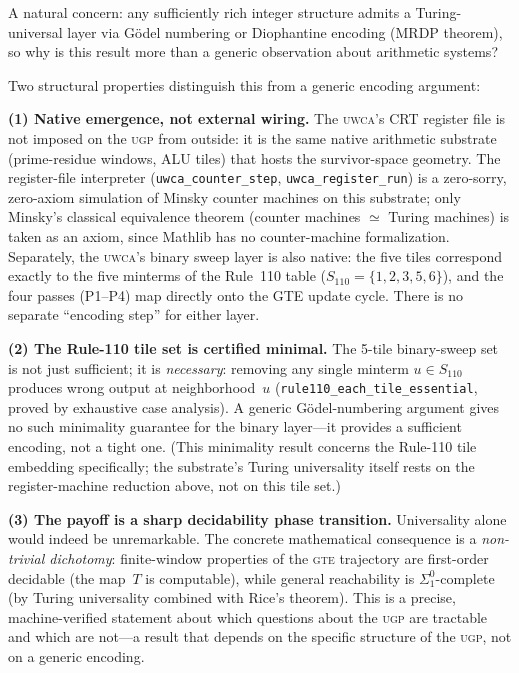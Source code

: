 \documentclass[11pt,a4paper]{article}
\newenvironment{keybox}[1]{%
  \Needspace*{8\baselineskip}%
  \begin{tcolorbox}[
    enhanced,
    breakable=false,
    colback=blue!5,
    colframe=blue!45!black,
    coltitle=black,
    colbacktitle=blue!14,
    boxrule=0.85pt,
    arc=2.5pt,
    left=9pt, right=9pt, top=6pt, bottom=6pt,
    titlerule=0.55pt,
    fonttitle=\bfseries,
    title={#1},
    before upper=\raggedright,
    before skip=0.9\baselineskip,
    after skip=0.9\baselineskip
  ]%
}{%
  \end{tcolorbox}%
}
\theoremstyle{definition}
\newcommand{\ugp}{\textsc{ugp}}
\newcommand{\gte}{\textsc{gte}}
\newcommand{\uwca}{\textsc{uwca}}
\begin{document}
\begin{keybox}{Why this Turing universality is non-vacuous}
A natural concern: any sufficiently rich integer structure admits a Turing-universal
layer via Gödel numbering or Diophantine encoding (MRDP theorem), so why is this result
more than a generic observation about arithmetic systems?

\medskip
Two structural properties distinguish this from a generic encoding argument:

\medskip
\noindent\textbf{(1) Native emergence, not external wiring.}
The \uwca{}'s CRT register file is not imposed on the \ugp{} from outside: it is the
same native arithmetic substrate (prime-residue windows, ALU tiles) that hosts the
survivor-space geometry.  The register-file interpreter (\lstinline|uwca_counter_step|,
\lstinline|uwca_register_run|) is a zero-sorry, zero-axiom simulation of Minsky counter
machines on this substrate; only Minsky's classical equivalence theorem (counter
machines $\simeq$ Turing machines) is taken as an axiom, since Mathlib has no
counter-machine formalization.  Separately, the \uwca{}'s binary sweep layer is also
native: the five tiles correspond exactly to the five minterms of the Rule~110 table
($S_{110} = \{1,2,3,5,6\}$), and the four passes (P1--P4) map directly onto the GTE
update cycle.  There is no separate ``encoding step'' for either layer.

\medskip
\noindent\textbf{(2) The Rule-110 tile set is certified minimal.}
The 5-tile binary-sweep set is not just sufficient; it is \emph{necessary}: removing any
single minterm $u \in S_{110}$ produces wrong output at neighborhood~$u$
(\lstinline|rule110_each_tile_essential|, proved by exhaustive case analysis).
A generic Gödel-numbering argument gives no such minimality guarantee for the binary
layer---it provides a sufficient encoding, not a tight one.  (This minimality result
concerns the Rule-110 tile embedding specifically; the substrate's Turing universality
itself rests on the register-machine reduction above, not on this tile set.)

\medskip
\noindent\textbf{(3) The payoff is a sharp decidability phase transition.}
Universality alone would indeed be unremarkable.  The concrete mathematical
consequence is a \emph{non-trivial dichotomy}: finite-window properties of
the \gte{} trajectory are first-order decidable (the map~$T$ is computable),
while general reachability is $\Sigma^0_1$-complete (by Turing universality
combined with Rice's theorem).  This is a precise, machine-verified statement
about which questions about the \ugp{} are tractable and which are not---a
result that depends on the specific structure of the \ugp{}, not on a generic
encoding.
\end{keybox}
\end{document}
